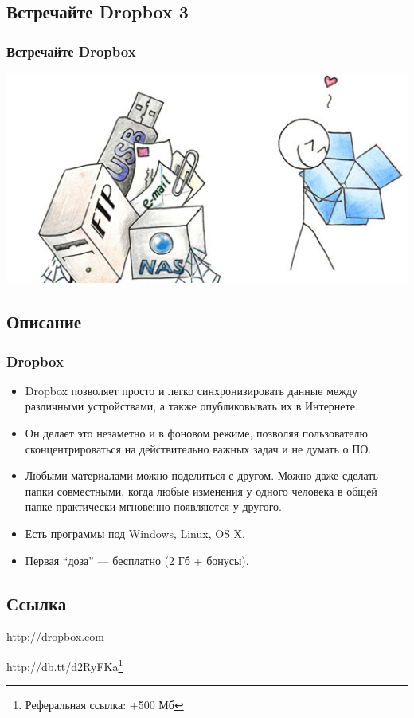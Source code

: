 \documentclass[compress,red]{beamer}
\begin{document}
\subsection{Встречайте Dropbox 3}
\begin{frame}[fragile]
  \frametitle{Встречайте Dropbox}
  \centerline{\includegraphics[width=1.0\textwidth]{images/ilovedropbox2.jpg}}
\end{frame}

\subsection{Описание}
\begin{frame}[fragile]
  \frametitle{Dropbox}
  \begin{itemize}
    \item Dropbox позволяет просто и легко синхронизировать данные между различными устройствами, а также опубликовывать их в Интернете.
    \item Он делает это незаметно и в фоновом режиме, позволяя пользователю сконцентрироваться на действительно важных задач и не думать о ПО.
    \item Любыми материалами можно поделиться с другом. Можно даже сделать папки совместными, когда любые изменения у одного человека в общей папке практически мгновенно появляются у другого.
    \item Есть программы под Windows, Linux, OS X.
    \item Первая ``доза'' --- бесплатно (2 Гб + бонусы).
  \end{itemize}
\end{frame}

\subsection{Ссылка}
\begin{frame}
  \begin{center}
    \Huge{http://dropbox.com}
  \end{center}
  \begin{center}
    \Huge{http://db.tt/d2RyFKa}\footnote{Реферальная ссылка: +500 Мб}
  \end{center}
\end{frame}
\end{document}
